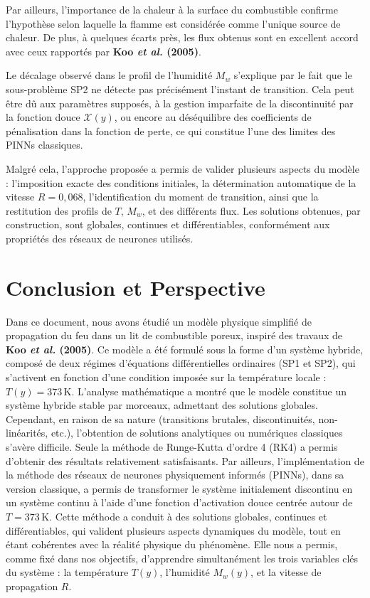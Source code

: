 \documentclass[12pt, oneside]{report} %
\theoremstyle{definition}
\theoremstyle{remark}
\begin{document}
Par ailleurs, l’importance de la chaleur à la surface du combustible confirme l’hypothèse selon laquelle la flamme est considérée comme l’unique source de chaleur.  
De plus, à quelques écarts près, les flux obtenus sont en excellent accord avec ceux rapportés par \textbf{Koo \textit{et al.} (2005)}.

Le décalage observé dans le profil de l’humidité $M_w$ s’explique par le fait que le sous-problème SP2 ne détecte pas précisément l’instant de transition.  
Cela peut être dû aux paramètres supposés, à la gestion imparfaite de la discontinuité par la fonction douce $\mathcal{X}(y)$, ou encore au déséquilibre des coefficients de pénalisation dans la fonction de perte, ce qui constitue l’une des limites des PINNs classiques.

Malgré cela, l’approche proposée a permis de valider plusieurs aspects du modèle :  
l’imposition exacte des conditions initiales, la détermination automatique de la vitesse $R = 0{,}068$, l’identification du moment de transition, ainsi que la restitution des profils de $T$, $M_w$, et des différents flux.  
Les solutions obtenues, par construction, sont globales, continues et différentiables, conformément aux propriétés des réseaux de neurones utilisés.


	
	\chapter*{Conclusion et Perspective}  
	\vspace{-0.4cm}
	
Dans ce document, nous avons étudié un modèle physique simplifié de propagation du feu dans un lit de combustible poreux, inspiré des travaux de \textbf{Koo \textit{et al.} (2005)}.  
Ce modèle a été formulé sous la forme d’un système hybride, composé de deux régimes d’équations différentielles ordinaires (SP1 et SP2), qui s’activent en fonction d’une condition imposée sur la température locale : $T(y) = 373\,\mathrm{K}$.
L’analyse mathématique a montré que le modèle constitue un système hybride stable par morceaux, admettant des solutions globales.  
Cependant, en raison de sa nature (transitions brutales, discontinuités, non-linéarités, etc.), l’obtention de solutions analytiques ou numériques classiques s’avère difficile.  
Seule la méthode de Runge-Kutta d’ordre 4 (RK4) a permis d’obtenir des résultats relativement satisfaisants.
Par ailleurs, l’implémentation de la méthode des réseaux de neurones physiquement informés (PINNs), dans sa version classique, a permis de transformer le système initialement discontinu en un système continu à l’aide d’une fonction d’activation douce centrée autour de $T = 373\,\mathrm{K}$.  
Cette méthode a conduit à des solutions globales, continues et différentiables, qui valident plusieurs aspects dynamiques du modèle, tout en étant cohérentes avec la réalité physique du phénomène.  
Elle nous a permis, comme fixé dans nos objectifs, d’apprendre simultanément les trois variables clés du système : la température $T(y)$, l’humidité $M_w(y)$, et la vitesse de propagation $R$.
\end{document}

